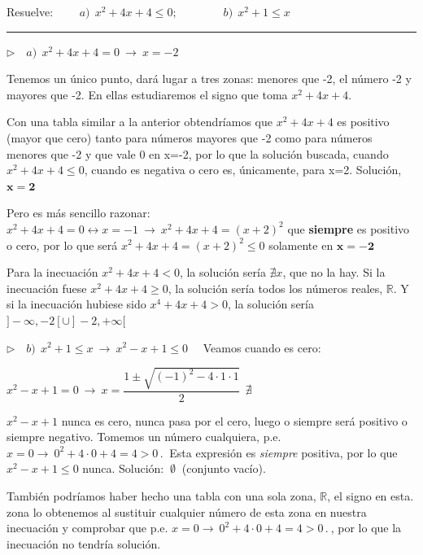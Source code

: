\begin{miejercicio}

Resuelve: $\qquad a)\ \ x^2+4x+4\leqslant 0;\qquad \qquad b)\ \ x^2+1\leqslant x$

\rule{250pt}{0.1pt}

\vspace{5mm} $\triangleright \quad a)\ \ x^2+4x+4=0 \ \to \ x=-2$

\vspace{2mm} Tenemos un único punto, dará lugar a tres zonas: menores que -2, el número -2 y mayores que -2. En ellas estudiaremos el signo que toma $x^2+4x+4$. 

\vspace{2mm} Con una tabla similar a la anterior obtendríamos que $x^2+4x+4$ es positivo (mayor que cero) tanto para números mayores que -2 como para números menores que -2 y que vale 0 en x=-2, por lo que la solución buscada, cuando $x^2+4x+4\leqslant0$, cuando es negativa o cero es, únicamente, para x=2. Solución, $\boldsymbol{x=2}$

\vspace{2mm} Pero es más sencillo razonar: $x^2+4x+4=0 \leftrightarrow x=-1 \ \to \ x^2+4x+4=(x+2)^2$ que \textbf{siempre} es positivo o cero, por lo que será $x^2+4x+4=(x+2)^2\leqslant 0$ solamente en $\boldsymbol{x=-2}$

\vspace{2mm} Para la inecuación $x^2+4x+4<0$, la solución sería $\nexists x$, que no la hay. Si la inecuación fuese $x^2+4x+4\geqslant 0$, la solución sería todos los números reales, $\mathbb R$. Y si la inecuación hubiese sido $x^4+4x+4>0$, la solución sería $]-\infty,-2[	\cup ]-2,+\infty[$

\vspace{5mm} $\triangleright \quad b) \ \ x^2+1\leqslant x \ \to \ x^2-x+1 \leqslant 0 \quad $ Veamos cuando es cero:

\vspace{2mm} $x^2-x+1=0 \ \to \ x=\dfrac{1\pm \sqrt{(-1)^2-4\cdot 1 \cdot 1}}{2} \ \ \nexists\ $  

\vspace{2mm} $x^2-x+1$ nunca es cero, nunca pasa por el cero, luego o siempre será positivo o siempre negativo. Tomemos un número cualquiera, p.e. $x=0 \to \ 0^2+4\cdot 0 + 4=4 > 0\, . \ $ Esta expresión es \emph{siempre} positiva, por lo que $x^2-x+1\leqslant 0$ nunca. Solución: $\ \emptyset   \ $ (conjunto vacío).

\vspace{2mm} También podríamos haber hecho una tabla con una sola zona, $\mathbb R$, el signo en esta. zona lo obtenemos al sustituir cualquier número de esta zona en nuestra inecuación y comprobar que  p.e. $x=0 \to \ 0^2+4\cdot 0 + 4=4 > 0\, . \ $, por lo que la inecuación no tendría solución.

\end{miejercicio}

